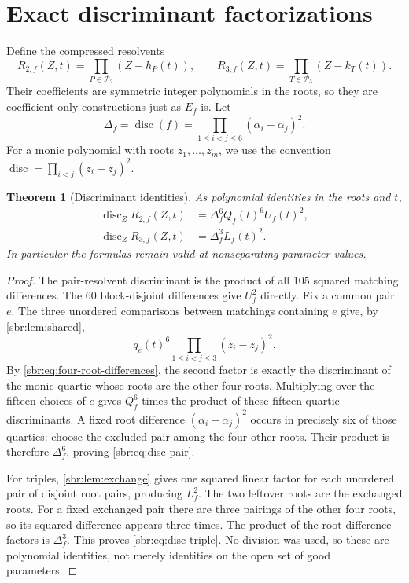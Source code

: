 \documentclass[11pt,letterpaper]{article}
\numberwithin{equation}{section}
\newtheorem{theorem}{Theorem}[section]
\theoremstyle{definition}
\theoremstyle{remark}
\DeclareMathOperator{\disc}{disc}
\newcommand{\Ptwo}{\mathcal P_2}
\newcommand{\Pthree}{\mathcal P_3}
\newcommand{\Rtwo}{R_{2,f}}
\newcommand{\Rthree}{R_{3,f}}
\begin{document}
\section{Exact discriminant factorizations}
\label{sbr:sec:discriminants}

Define the compressed resolvents
\begin{equation}
 \Rtwo(Z,t)=\prod_{P\in\Ptwo}(Z-h_P(t)),\qquad
 \Rthree(Z,t)=\prod_{T\in\Pthree}(Z-k_T(t)).
 \label{sbr:eq:resolvents}
\end{equation}
Their coefficients are symmetric integer polynomials in the roots, so they
are coefficient-only constructions just as $E_f$ is. Let
\begin{equation}
 \Delta_f=\disc(f)=\prod_{1\le i<j\le6}(\alpha_i-\alpha_j)^2.
\end{equation}
For a monic polynomial with roots $z_1,\ldots,z_m$, we use the convention
$\disc=\prod_{i<j}(z_i-z_j)^2$.

\begin{theorem}[Discriminant identities]
\label{sbr:thm:discriminants}
As polynomial identities in the roots and $t$,
\begin{align}
 \disc_Z\Rtwo(Z,t)&=\Delta_f^6Q_f(t)^6U_f(t)^2,
 \label{sbr:eq:disc-pair}\\
 \disc_Z\Rthree(Z,t)&=\Delta_f^3L_f(t)^2.
 \label{sbr:eq:disc-triple}
\end{align}
In particular the formulas remain valid at nonseparating parameter values.
\end{theorem}
\begin{proof}
The pair-resolvent discriminant is the product of all 105 squared matching
differences. The 60 block-disjoint differences give $U_f^2$ directly.
Fix a common pair $e$. The three unordered comparisons between matchings
containing $e$ give, by \cref{sbr:lem:shared},
\[
 q_e(t)^6\prod_{1\le i<j\le3}(z_i-z_j)^2.
\]
By \cref{sbr:eq:four-root-differences}, the second factor is exactly the
discriminant of the monic quartic whose roots are the other four roots.
Multiplying over the fifteen choices of $e$ gives $Q_f^6$ times the
product of these fifteen quartic discriminants. A fixed root difference
$(\alpha_i-\alpha_j)^2$ occurs in precisely six of those quartics: choose
the excluded pair among the four other roots. Their product is therefore
$\Delta_f^6$, proving \cref{sbr:eq:disc-pair}.

For triples, \cref{sbr:lem:exchange} gives one squared linear factor for each
unordered pair of disjoint root pairs, producing $L_f^2$. The two leftover
roots are the exchanged roots. For a fixed exchanged pair there are three
pairings of the other four roots, so its squared difference appears three
times. The product of the root-difference factors is $\Delta_f^3$.
This proves \cref{sbr:eq:disc-triple}. No division was used, so these are
polynomial identities, not merely identities on the open set of good
parameters.
\end{proof}
\end{document}

